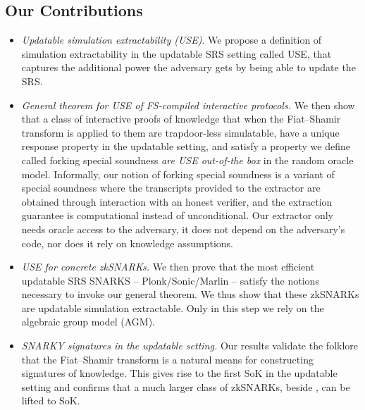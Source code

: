 \subsection{Our Contributions}
\begin{itemize}
\item 
\emph{Updatable simulation extractability (USE)}. 
We propose a definition of simulation extractability in the updatable SRS setting called USE, that captures the additional power the adversary gets by being able to update the SRS.%
    
  \item \emph{General theorem for USE of FS-compiled interactive protocols.} We
        then show that a class of interactive proofs of knowledge that when
        the Fiat--Shamir transform is applied to them are trapdoor-less simulatable, have a
        unique response property in the updatable setting, and satisfy a
        property we define called forking special soundness \emph{are USE
        out-of-the box} in the random oracle model. Informally, our notion of forking
        special soundness is a variant of special soundness where the
        transcripts provided to the extractor are obtained through interaction
        with an honest verifier, and the extraction guarantee is computational
        instead of unconditional. Our extractor only needs oracle access to the
        adversary, it does not depend on the adversary’s code, nor does it rely on
        knowledge assumptions.
    
\item
\emph{USE for concrete zkSNARKs.}
We then prove that the most efficient updatable SRS SNARKS -- Plonk/Sonic/Marlin -- satisfy the notions necessary to invoke our general theorem. We thus show that these zkSNARKs are updatable simulation extractable.
Only in this step we rely on the algebraic group model (AGM).

\item
  \emph{SNARKY signatures in the updatable setting.} Our results validate the folklore that the Fiat--Shamir transform is a natural means for constructing signatures of knowledge. This gives rise to the first SoK in the updatable setting and confirms that a much larger class of zkSNARKs, beside \cite{C:GroMal17}, can be lifted to SoK.
	
\end{itemize}



